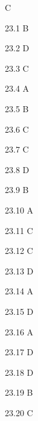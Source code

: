 \begin{Solution}{23}
C
\end{Solution}
\begin{Solution}{23.{1}}
B
\end{Solution}
\begin{Solution}{23.{2}}
D
\end{Solution}
\begin{Solution}{23.{3}}
C
\end{Solution}
\begin{Solution}{23.{4}}
A
\end{Solution}
\begin{Solution}{23.{5}}
B
\end{Solution}
\begin{Solution}{23.{6}}
C
\end{Solution}
\begin{Solution}{23.{7}}
C
\end{Solution}
\begin{Solution}{23.{8}}
D
\end{Solution}
\begin{Solution}{23.{9}}
B
\end{Solution}
\begin{Solution}{23.{10}}
A
\end{Solution}
\begin{Solution}{23.{11}}
C
\end{Solution}
\begin{Solution}{23.{12}}
C
\end{Solution}
\begin{Solution}{23.{13}}
D
\end{Solution}
\begin{Solution}{23.{14}}
A
\end{Solution}
\begin{Solution}{23.{15}}
D
\end{Solution}
\begin{Solution}{23.{16}}
A
\end{Solution}
\begin{Solution}{23.{17}}
D
\end{Solution}
\begin{Solution}{23.{18}}
D
\end{Solution}
\begin{Solution}{23.{19}}
B
\end{Solution}
\begin{Solution}{23.{20}}
C
\end{Solution}
